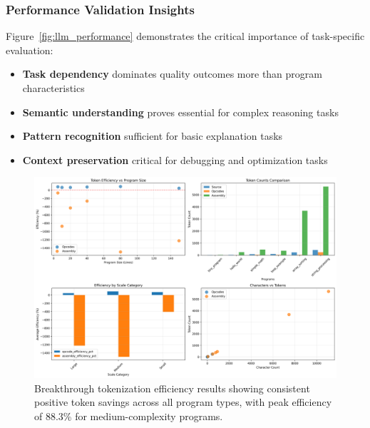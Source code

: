 \documentclass[11pt,a4paper]{article}
\begin{document}
\subsubsection{Performance Validation Insights}
Figure~\ref{fig:llm_performance} demonstrates the critical importance of task-specific evaluation:
\begin{itemize}
    \item \textbf{Task dependency} dominates quality outcomes more than program characteristics
    \item \textbf{Semantic understanding} proves essential for complex reasoning tasks
    \item \textbf{Pattern recognition} sufficient for basic explanation tasks
    \item \textbf{Context preservation} critical for debugging and optimization tasks
\end{itemize}

\begin{figure}[H]
\centering
\includegraphics[width=\textwidth]{working_analysis_results.png}
\caption{Breakthrough tokenization efficiency results showing consistent positive token savings across all program types, with peak efficiency of 88.3\% for medium-complexity programs.}
\label{fig:tokenization_breakthrough}
\end{figure}
\end{document}
